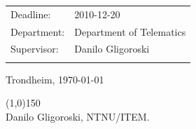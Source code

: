 \documentclass[english,a4paper,12pt,titlepage,twoside]{report}
\begin{document}
\begin{titlepage}
\begin{center}
\begin{tabular}{ p{4cm} p{11cm}}
Deadline: & 2010-12-20 \\
Department: & Department of Telematics \\
Supervisor: & Danilo Gligoroski \\\\
\end{tabular}
\vspace{0.5cm}

Trondheim, \today

\vspace{0.4cm}
\line(1,0){150} \\
Danilo Gligoroski, NTNU/ITEM.

\end{center}
\end{titlepage}
\end{document}

